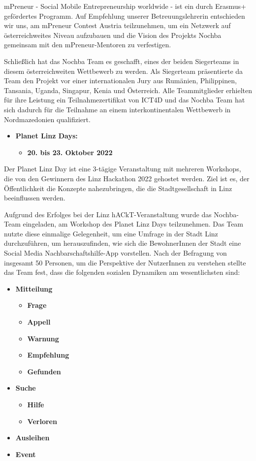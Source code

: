 mPreneur - Social Mobile Entrepreneurship worldwide - ist ein durch Erasmus+ gefördertes Programm. Auf Empfehlung unserer Betreuungslehrerin entschieden wir uns, am mPreneur Contest Austria teilzunehmen, um ein Netzwerk auf österreichweites Niveau aufzubauen und die Vision des Projekts Nochba gemeinsam mit den mPreneur-Mentoren zu verfestigen. 

Schließlich hat das Nochba Team es geschafft, eines der beiden Siegerteams in diesem österreichweiten Wettbewerb zu werden. Als Siegerteam präsentierte da Team den Projekt vor einer internationalen Jury aus Rumänien, Philippinen, Tansania, Uganda, Singapur, Kenia und Österreich. Alle Teammitglieder erhielten für ihre Leistung ein Teilnahmezertifikat von ICT4D und das Nochba Team hat sich dadurch für die Teilnahme an einem interkontinentalen Wettbewerb in Nordmazedonien qualifiziert.

\begin{itemize}
    \item \textbf{Planet Linz Days:}
    \begin{itemize}
        \item \textbf{20. bis 23. Oktober 2022}
    \end{itemize}
\end{itemize}

Der Planet Linz Day ist eine 3-tägige Veranstaltung mit mehreren Workshops, die von den Gewinnern des Linz Hackathon 2022 gehostet werden. Ziel ist es, der Öffentlichkeit die Konzepte nahezubringen, die die Stadtgesellschaft in Linz beeinflussen werden.

Aufgrund des Erfolges bei der Linz hACkT-Veranstaltung wurde das Nochba-Team eingeladen, am Workshop des Planet Linz Days teilzunehmen. Das Team nutzte diese einmalige Gelegenheit, um eine Umfrage in der Stadt Linz durchzuführen, um herauszufinden, wie sich die BewohnerInnen der Stadt eine Social Media Nachbarschaftshilfe-App vorstellen. Nach der Befragung von insgesamt 50 Personen, um die Perspektive der NutzerInnen zu verstehen 
stellte das Team fest, dass die folgenden sozialen Dynamiken am wesentlichsten sind:


\begin{itemize}
    \item \textbf{Mitteilung}
    \begin{itemize}
        \item \textbf{Frage}
        \item \textbf{Appell}
        \item \textbf{Warnung}
        \item \textbf{Empfehlung}
        \item \textbf{Gefunden}
    \end{itemize}
    \item \textbf{Suche}
    \begin{itemize}
        \item \textbf{Hilfe}
        \item \textbf{Verloren}
    \end{itemize}
    \item \textbf{Ausleihen}
    \item \textbf{Event}
\end{itemize}


